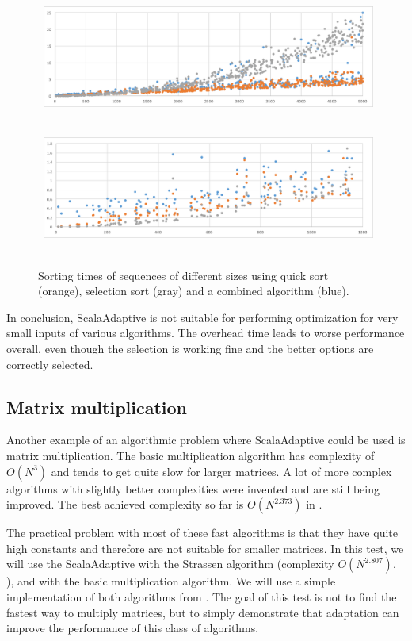 \begin{figure}[h!]
	\captionsetup{justification=centering,margin=0.5cm}
	\centerline{
		\mbox{
			\includegraphics[width=110mm]{./img/sort_graph1.png}
		}
	}
	\centerline{
		\mbox{
			\includegraphics[width=110mm]{./img/sort_graph2.png}
		}
	}
	\caption{Sorting times of sequences of different sizes using quick sort (orange), selection sort (gray) and a combined algorithm (blue).}
	\label{fig:sorting_graph}
\end{figure}

In conclusion, ScalaAdaptive is not suitable for performing optimization for very small inputs of various algorithms. The overhead time leads to worse performance overall, even though the selection is working fine and the better options are correctly selected.

\subsection{Matrix multiplication}

Another example of an algorithmic problem where ScalaAdaptive could be used is matrix multiplication. The basic multiplication algorithm has complexity of $O(N^3)$ and tends to get quite slow for larger matrices. A lot of more complex algorithms with slightly better complexities were invented and are still being improved. The best achieved complexity so far is $O(N^2.373)$ in \cite{williams_multiplying_2012}.

The practical problem with most of these fast algorithms is that they have quite high constants and therefore are not suitable for smaller matrices. In this test, we will use the ScalaAdaptive with the Strassen algorithm (complexity $O(N^2.807)$, \cite{strassen_gaussian_1969}), and with the basic multiplication algorithm. We will use a simple implementation of both algorithms from \cite{noauthor_jlinalg_nodate}. The goal of this test is not to find the fastest way to multiply matrices, but to simply demonstrate that adaptation can improve the performance of this class of algorithms.



